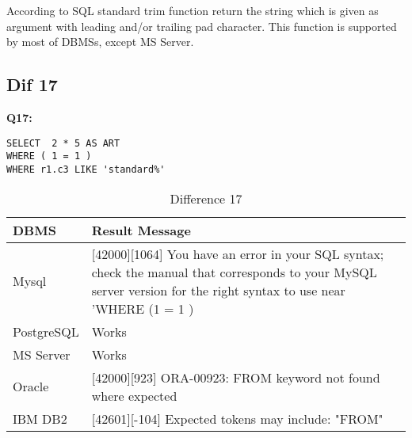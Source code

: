\hfill\newpage
According to SQL standard trim function return the string which is given as argument with leading and/or trailing pad character. This function is supported by most of DBMSs, except MS Server. 


\subsection{Dif 17}

\textbf{Q17:}
\begin{mdframed}[backgroundcolor=lightgray!20]
\begin{lstlisting}[style=SQL]
SELECT  2 * 5 AS ART
WHERE ( 1 = 1 )
WHERE r1.c3 LIKE 'standard%'
\end{lstlisting}
\end{mdframed}


\begin{table}[h]
\centering
\caption{Difference 17}
\label{my-label}
\begin{tabular}{|p{2cm}|p{11.5cm}| }
\hline
\textbf{DBMS} & \textbf{Result Message}                                                                                                                                                     \\ \hline
Mysql         & {[}42000{]}{[}1064{]} You have an error in your SQL syntax; check the manual that corresponds to your MySQL server version for the right syntax to use near 'WHERE (1 = 1 ) \\ \hline
PostgreSQL    & Works                                                                                                                                                                       \\ \hline
MS Server     & Works                                                                                                                                                                       \\ \hline
Oracle        & {[}42000{]}{[}923{]} ORA-00923: FROM keyword not found where expected                                                                                                       \\ \hline
IBM DB2       & {[}42601{]}{[}-104{]} Expected tokens may include: "FROM"                                                                                                                   \\ \hline
\end{tabular}
\end{table}

